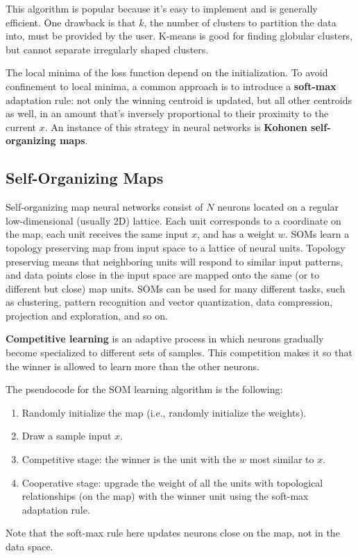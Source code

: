 This algorithm is popular because it's easy to implement and is generally efficient. One drawback is that $k$, the number of clusters to partition the data into, must be provided by the user. K-means is good for finding globular clusters, but cannot separate irregularly shaped clusters.

The local minima of the loss function depend on the initialization. To avoid confinement to local minima, a common approach is to introduce a \textbf{soft-max} adaptation rule: not only the winning centroid is updated, but all other centroids as well, in an amount that's inversely proportional to their proximity to the current $x$. An instance of this strategy in neural networks is \textbf{Kohonen self-organizing maps}.

\subsection{Self-Organizing Maps}

Self-organizing map neural networks consist of $N$ neurons located on a regular low-dimensional (usually 2D) lattice. Each unit corresponds to a coordinate on the map, each unit receives the same input $x$, and has a weight $w$. SOMs learn a topology preserving map from input space to a lattice of neural units. Topology preserving means that neighboring units will respond to similar input patterns, and data points close in the input space are mapped onto the same (or to different but close) map units. SOMs can be used for many different tasks, such as clustering, pattern recognition and vector quantization, data compression, projection and exploration, and so on.

\textbf{Competitive learning} is an adaptive process in which neurons gradually become specialized to different sets of samples. This competition makes it so that the winner is allowed to learn more than the other neurons.

The pseudocode for the SOM learning algorithm is the following:
\begin{enumerate}
    \item Randomly initialize the map (i.e., randomly initialize the weights).

    \item Draw a sample input $x$.

    \item Competitive stage: the winner is the unit with the $w$ most similar to $x$.

    \item Cooperative stage: upgrade the weight of all the units with topological relationships (on the map) with the winner unit using the soft-max adaptation rule.
\end{enumerate}
Note that the soft-max rule here updates neurons close on the map, not in the data space.

